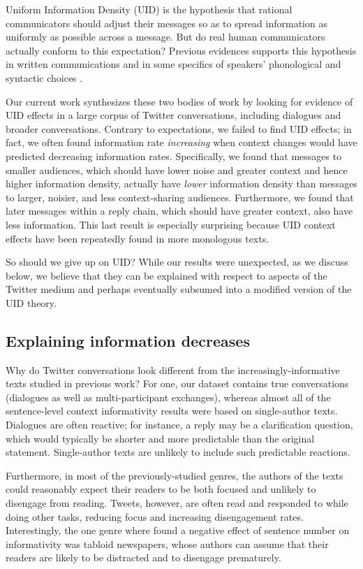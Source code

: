 \documentclass[11pt,letterpaper]{article}
\begin{document}
Uniform Information Density (UID) is the hypothesis that rational communicators should adjust their messages so as to spread information as uniformly as possible across a message. But do real human communicators actually conform to this expectation? Previous evidences supports this hypothesis in written communications \cite{genzel2002,qian2012} and in some specifics of speakers' phonological \cite{aylett2004} and syntactic choices \cite{levy2007}. 

Our current work synthesizes these two bodies of work by looking for evidence of UID effects in a large corpus of Twitter conversations, including dialogues and broader conversations.  Contrary to expectations, we failed to find UID effects; in fact, we often found information rate \emph{increasing} when context changes would have predicted decreasing information rates.  Specifically, we found that messages to smaller audiences, which should have lower noise and greater context and hence higher information density, actually have \emph{lower} information density than messages to larger, noisier, and less context-sharing audiences. Furthermore, we found that later messages within a reply chain, which should have greater context, also have less information.  This last result is especially surprising because UID context effects have been repeatedly found in more monologous texts.

So should we give up on UID? While our results were unexpected, as we discuss below, we believe that they can be explained with respect to aspects of the Twitter medium and perhaps eventually subsumed into a modified version of the UID theory.

\subsection{Explaining information decreases}

Why do Twitter conversations look different from the increasingly-informative texts studied in previous work? For one, our dataset contains true conversations (dialogues as well as multi-participant exchanges), whereas almost all of the sentence-level context informativity results were based on single-author texts.  Dialogues are often reactive; for instance, a reply may be a clarification question, 
which would typically be shorter and more predictable than the original statement. 
Single-author texts are unlikely to include such predictable reactions.

Furthermore, in most of the previously-studied genres, the authors of the texts could reasonably expect their readers to be both focused and unlikely to disengage from reading. Tweets, however, are often read and responded to while doing other tasks, reducing focus and increasing disengagement rates.  Interestingly, the one genre where  found a negative effect of sentence number on informativity was tabloid newspapers, whose authors can assume that their readers are likely to be distracted and to disengage prematurely.
\end{document}
